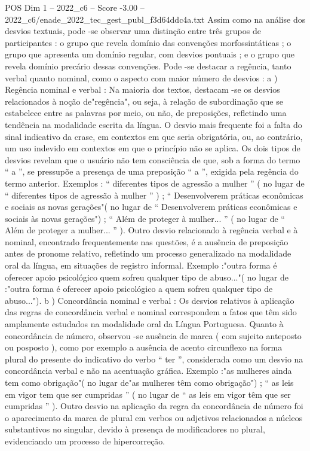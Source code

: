 \begin{textsample}{POS Dim 1 – 2022\_c6 – Score -3.00 – 2022\_c6/enade\_2022\_tec\_gest\_publ\_f3d64ddc4a.txt}
Assim como na análise dos desvios textuais, pode -se observar uma distinção entre três grupos de participantes : o grupo que revela domínio das convenções morfossintáticas ; o grupo que apresenta um domínio regular, com desvios pontuais ; e o grupo que revela domínio precário dessas convenções.
Pode -se destacar a regência, tanto verbal quanto nominal, como o aspecto com maior número de desvios : a ) Regência nominal e verbal : Na maioria dos textos, destacam -se os desvios relacionados à noção de"regência", ou seja, à relação de subordinação que se estabelece entre as palavras por meio, ou não, de preposições, refletindo uma tendência na modalidade escrita da língua.
O desvio mais frequente foi a falta do sinal indicativo da crase, em contextos em que seria obrigatória, ou, ao contrário, um uso indevido em contextos em que o princípio não se aplica.
Os dois tipos de desvios revelam que o usuário não tem consciência de que, sob a forma do termo “ a ”, se pressupõe a presença de uma preposição “ a ”, exigida pela regência do termo anterior.
Exemplos : “ diferentes tipos de agressão a mulher ” ( no lugar de “ diferentes tipos de agressão à mulher ” ) ; “ Desenvolverem práticas econômicas e sociais as novas gerações"( no lugar de “ Desenvolverem práticas econômicas e sociais às novas gerações") ; “ Além de proteger à mulher... ” ( no lugar de “ Além de proteger a mulher... ” ).
Outro desvio relacionado à regência verbal e à nominal, encontrado frequentemente nas questões, é a ausência de preposição antes de pronome relativo, refletindo um processo generalizado na modalidade oral da língua, em situações de registro informal.
Exemplo :"outra forma é oferecer apoio psicológico quem sofreu qualquer tipo de abuso..."( no lugar de :"outra forma é oferecer apoio psicológico a quem sofreu qualquer tipo de abuso..."). b ) Concordância nominal e verbal : Os desvios relativos à aplicação das regras de concordância verbal e nominal correspondem a fatos que têm sido amplamente estudados na modalidade oral da Língua Portuguesa.
Quanto à concordância de número, observou -se ausência de marca ( com sujeito anteposto ou posposto ), como por exemplo a ausência de acento circunflexo na forma plural do presente do indicativo do verbo “ ter ”, considerada como um desvio na concordância verbal e não na acentuação gráfica.
Exemplo :"as mulheres ainda tem como obrigação"( no lugar de"as mulheres têm como obrigação") ; “ as leis em vigor tem que ser cumpridas ” ( no lugar de “ as leis em vigor têm que ser cumpridas ” ).
Outro desvio na aplicação da regra da concordância de número foi o aparecimento da marca de plural em verbos ou adjetivos relacionados a núcleos substantivos no singular, devido à presença de modificadores no plural, evidenciando um processo de hipercorreção.

\end{textsample}
